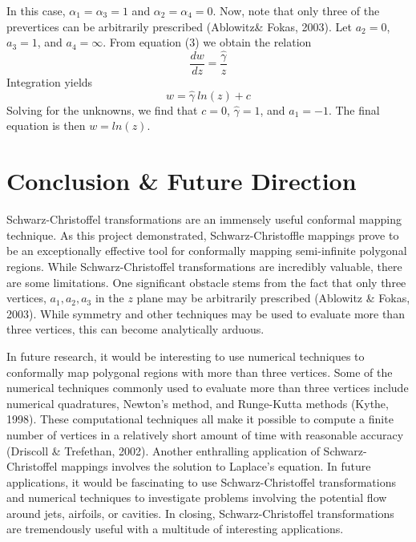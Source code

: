 \documentclass{article}
\begin{document}
    In this case, \(\alpha_{1} = \alpha_{3} = 1\) and \(\alpha_{2} = \alpha_{4} = 0\). Now, note that only three of the prevertices can be arbitrarily prescribed (Ablowitz\& Fokas, 2003). Let \(a_{2} = 0\), \(a_{3} = 1\), and \(a_{4} = \infty\).  
    From equation (3) we obtain the relation
    \begin{equation}
        \frac{dw}{dz} = \frac{\hat{\gamma}}{z}
    \end{equation}
    Integration yields
    \begin{equation}
        w = \hat{\gamma} \ ln(z) + c
    \end{equation}
    Solving for the unknowns, we find that \(c = 0\), \(\hat{\gamma} = 1\), and \(a_{1} = -1\). The final equation is then \(w = ln(z)\).

\section{Conclusion \& Future Direction}
Schwarz-Christoffel transformations are an immensely useful conformal mapping technique. As this project demonstrated,  Schwarz-Christoffle mappings prove to be an exceptionally effective tool for conformally mapping semi-infinite polygonal regions. While Schwarz-Christoffel transformations are incredibly valuable, there are some limitations. One significant obstacle stems from the fact that only three vertices, \(a_{1}, a_{2}, a_{3}\) in the $z$ plane may be arbitrarily prescribed (Ablowitz \& Fokas, 2003). While symmetry and other techniques may be used to evaluate more than three vertices, this can become analytically arduous. 

In future research, it would be interesting to use numerical techniques to conformally map polygonal regions with more than three vertices. Some of the numerical techniques commonly used to evaluate more than three vertices include numerical quadratures, Newton’s method, and Runge-Kutta methods (Kythe, 1998). These computational techniques all make it possible to compute a finite number of vertices in a relatively short amount of time with reasonable accuracy (Driscoll \& Trefethan, 2002). Another enthralling application of Schwarz-Christoffel mappings involves the solution to Laplace’s equation. In future applications, it would be fascinating to use Schwarz-Christoffel transformations and numerical techniques to investigate problems involving the potential flow around jets, airfoils, or cavities. In closing, Schwarz-Christoffel transformations are tremendously useful with a multitude of interesting applications.
\end{document}
